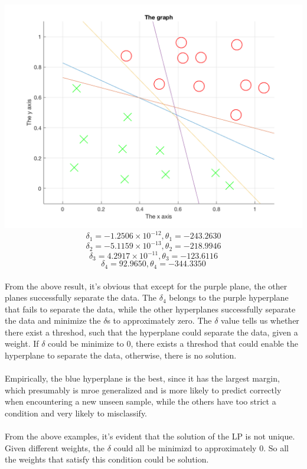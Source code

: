 \begin{enumerate}
\begin{enumerate}
					\includegraphics[scale=0.3]{pic/learnMultipleHyperplanes.png}
					\[\delta_1= -1.2506\times 10^{-12},\theta_1= -243.2630\]
					\[\delta_2= -5.1159\times 10^{-13},\theta_2= -218.9946\]
					\[\delta_3= 4.2917\times 10^{-11},\theta_3= -123.6116\]
					\[\delta_4= 92.9650,\theta_4= -344.3350\]\\
					From the above result, it's obvious that except for the purple plane, the other planes successfully separate the data.
					The \(\delta_4\) belongs to the purple hyperplane that fails to separate the data, while the other hyperplanes successfully separate the data and minimize the \(\delta\)s to approximately zero. The \(\delta\) value tells us whether there exist a threshod, such that the hyperplane could separate the data, given a weight. If \(\delta\) could be minimize to 0, there exists a threshod that could enable the hyperplane to separate the data, otherwise, there is no solution.\\\\
					Empirically, the blue hyperplane is the best, since it has the largest margin, which presumably is mroe generalized and is more likely to predict correctly when encountering a new unseen sample, while the others have too strict a condition and very likely to misclassify.\\\\
					From the above examples, it's evident that the solution of the LP is not unique. Given different weights, the \(\delta\) could all be minimizd to approximately 0. So all the weights that satisfy this condition could be solution.
	\end{enumerate}
\end{enumerate}



